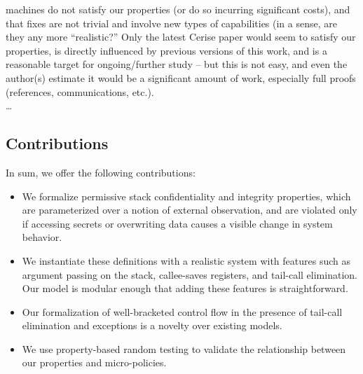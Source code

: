 {machines do not satisfy our properties (or do so incurring significant costs),
and that fixes are not trivial and involve new types of capabilities (in a
sense, are they any more ``realistic?'' Only the latest Cerise paper would seem
to satisfy our properties, is directly influenced by previous versions of this
work, and is a reasonable target for ongoing/further study -- but this is not
easy, and even the author(s) estimate it would be a significant amount of work,
especially full proofs (references, communications, etc.).
%
\\
%
\ldots
%
}

\subsection{Contributions}

In sum, we offer the following contributions:

\begin{itemize}
\item We formalize permissive stack confidentiality and integrity properties,
  which are parameterized over a notion of external
  observation, and are violated only if accessing secrets or overwriting
  data causes a visible change in system behavior.
\item We instantiate these definitions with a realistic
  system with features such as argument passing
  on the stack, callee-saves registers, and tail-call elimination.
  Our model is modular enough that adding these features is straightforward.
\item Our formalization of well-bracketed control flow in the presence of tail-call
  elimination \ifexceptions and exceptions \fi is a novelty over existing models.
\item We use property-based random testing to validate the relationship between
  our properties and micro-policies.
\end{itemize}

